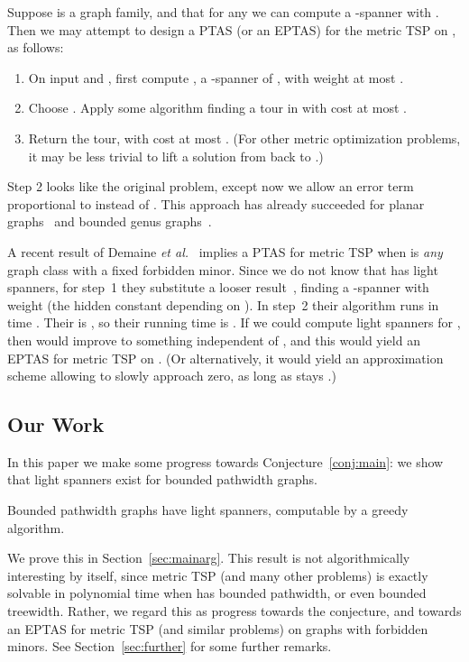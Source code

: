 \documentclass{llncs}
\begin{document}
Suppose  is a graph family, and that for any  we can compute a -spanner  with .  Then we may attempt to design a PTAS
(or an EPTAS) for the metric TSP on , as follows:
\begin{enumerate}

\item On input  and , first compute , a
  -spanner of , with weight at most
  .

\item Choose .
Apply some algorithm finding a tour in  with cost at most
.

\item Return the tour, with cost at most .  (For other metric optimization problems,
it may be less trivial to lift a solution from  back to .)

\end{enumerate}
Step 2 looks like the original problem, except now we allow an error term
proportional to  instead of .   This
approach has already succeeded for planar graphs~\cite
{DBLP:conf/soda/AroraGKKW98,KleinTSP2005} and bounded genus
graphs~\cite
{Demaine:2007:AAV:1283383.1283413,Grigni:2000:ATG:646253.686316}.

A recent result of Demaine \textit{et
al.}~\cite[Thm.~2]{ContractionMinorFree_STOC2011} implies a PTAS for
metric TSP when  is \emph{any} graph class with a fixed
forbidden minor.  Since we do not know that  has light
spanners, for step~1 they substitute a looser result~\cite
{Grigni:2002:LSA:545381.545492}, finding a -spanner 
with weight  (the hidden constant
depending on ).  In step~2 their algorithm runs in time
. Their  is
, so their
running time is .  If we could compute light
spanners for , then  would improve to something
independent of , and this would yield an EPTAS for metric TSP on
. (Or alternatively, it would yield an approximation
scheme allowing  to slowly approach zero, as long as
 stays .)

\subsection{Our Work}

In this paper we make some progress towards
Conjecture~\ref{conj:main}: we show that light spanners exist for
bounded pathwidth graphs.
\begin{theorem}\label{thm:main}
Bounded pathwidth graphs have light spanners, computable by a greedy
algorithm.
\end{theorem}
We prove this in Section~\ref{sec:mainarg}.
This result is not algorithmically interesting by itself, since metric
TSP (and many other problems) is exactly solvable in polynomial time
when  has bounded pathwidth, or even bounded treewidth.  Rather, we
regard this as progress towards the conjecture, and towards an EPTAS
for metric TSP (and similar problems) on graphs with forbidden minors.
See Section~\ref{sec:further} for some further remarks.
\end{document}
